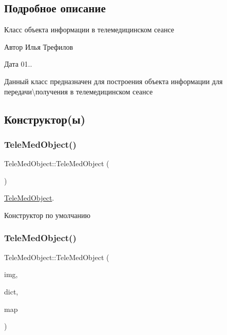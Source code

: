 \subsection{Подробное описание}
Класс объекта информации в телемедицинском сеансе 

\begin{DoxyAuthor}{Автор}
Илья Трефилов 
\end{DoxyAuthor}
\begin{DoxyDate}{Дата}
01..
\end{DoxyDate}
Данный класс предназначен для построения объекта информации для передачи\textbackslash{}получения в телемедицинском сеансе 

\subsection{Конструктор(ы)}
\mbox{\label{classTeleMedObject_a754462ce944702c386aa3b6191e4db33}} 
\subsubsection{\texorpdfstring{Tele\+Med\+Object()}{TeleMedObject()}\hspace{0.1cm}{\footnotesize\ttfamily [1/3]}}
{\footnotesize\ttfamily Tele\+Med\+Object\+::\+Tele\+Med\+Object (\begin{DoxyParamCaption}{ }\end{DoxyParamCaption})\hspace{0.3cm}{\ttfamily [inline]}}



\hyperlink{classTeleMedObject}{Tele\+Med\+Object}. 

Конструктор по умолчанию \mbox{\label{classTeleMedObject_a38ee0e32441775b2f4f10907b672af44}} 
\subsubsection{\texorpdfstring{Tele\+Med\+Object()}{TeleMedObject()}\hspace{0.1cm}{\footnotesize\ttfamily [2/3]}}
{\footnotesize\ttfamily Tele\+Med\+Object\+::\+Tele\+Med\+Object (\begin{DoxyParamCaption}\item[{Q\+Image}]{img,  }\item[{\hyperlink{tagshelpers_8h_ae25d30658f61420b88a380dc9e40bb74}{dicom\+Dict}}]{dict,  }\item[{\hyperlink{dbform_8h_a1ec1a645f41e1c6544d384ca863a936c}{add\+Info\+Map}}]{map }\end{DoxyParamCaption})}



